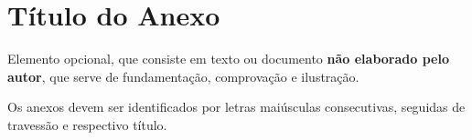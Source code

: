 \chapter{Título do Anexo}

Elemento opcional, que consiste em texto ou documento \textbf{não elaborado pelo autor}, que serve de fundamentação, comprovação e ilustração.

Os anexos devem ser identificados por letras maiúsculas consecutivas, seguidas de travessão e respectivo título.